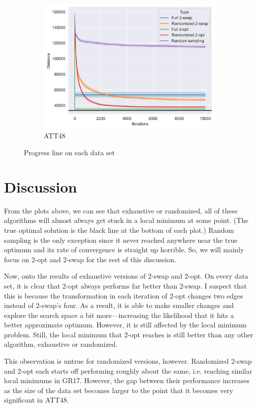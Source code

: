 \documentclass{article}
\begin{document}
\begin{figure}[h]
    \hfill
    \begin{subfigure}[b]{0.3\textwidth}
        \includegraphics[width=\textwidth]{images/att48_plot.png}
        \caption{ATT48}
    \end{subfigure}
    \caption{Progress line on each data set}
\end{figure}


\section{Discussion}

From the plots above, we can see that exhaustive or randomized, all of these algorithms will almost always get stuck in a local minimum at some point. (The true optimal solution is the black line at the bottom of each plot.) Random sampling is the only exception since it never reached anywhere near the true optimum and its rate of convergence is straight up horrible. So, we will mainly focus on 2-opt and 2-swap for the rest of this discussion.

Now, onto the results of exhaustive versions of 2-swap and 2-opt. On every data set, it is clear that 2-opt always performs far better than 2-swap. I suspect that this is because the transformation in each iteration of 2-opt changes two edges instead of 2-swap's four. As a result, it is able to make smaller changes and explore the search space a bit more---increasing the likelihood that it hits a better approximate optimum. However, it is still affected by the local minimum problem. Still, the local minimum that 2-opt reaches is still better than any other algorithm, exhaustive or randomized.

This observation is untrue for randomized versions, however. Randomized 2-swap and 2-opt each starts off performing roughly about the same, i.e. reaching similar local minimums in GR17. However, the gap between their performance increases as the size of the data set becomes larger to the point that it becomes very significant in ATT48.
\end{document}
